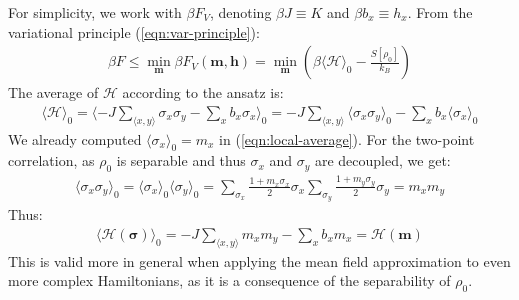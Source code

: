 \documentclass[../../main.tex]{subfiles}
\begin{document}
For simplicity, we work with $\beta F_V$, denoting $\beta J \equiv K$ and $\beta b_x \equiv h_x$. From the variational principle (\ref{eqn:var-principle}):
\begin{align}
    \beta F \leq  
    \min_{\bm{m}} \beta F_V(\bm{m}, \bm{h}) = \min_{\bm{m}} \left(
      \beta \langle \mathcal{H} \rangle_0 -\frac{S[\rho_0]}{k_B} \right) 
      \label{eqn:ising-variational}
\end{align}
The average of $\mathcal{H}$ according to the ansatz is:
\begin{align*}
    \langle \mathcal{H} \rangle_0 = \langle -J \sum_{\langle x,y \rangle} \sigma_x \sigma_y - \sum_x b_x \sigma_x \rangle_0 = -J \sum_{\langle x,y \rangle} \langle \sigma_x \sigma_y \rangle_0 - \sum_x b_x \langle \sigma_x \rangle_0
\end{align*}
We already computed $\langle \sigma_x \rangle_0 = m_x$ in (\ref{eqn:local-average}). For the two-point correlation, as $\rho_0$ is separable and thus $\sigma_x$ and $\sigma_y$ are decoupled, we get:
\begin{align*}
    \langle \sigma_x \sigma_y \rangle_0 = \langle \sigma_x \rangle_0 \langle \sigma_y \rangle_0 = \sum_{\sigma_x} \frac{1+m_x \sigma_x}{2} \sigma_x \sum_{\sigma_y} \frac{1+m_y \sigma_y}{2} \sigma_y = m_x m_y
\end{align*}
Thus:
\begin{align}\label{eqn:H0avg}
    \langle \mathcal{H}(\bm{\sigma}) \rangle_0 = -J \sum_{\langle x,y \rangle} m_x m_y - \sum_x b_x m_x = \mathcal{H}(\bm{m})
\end{align}
This is valid more in general when applying the mean field approximation to even more complex Hamiltonians, as it is a consequence of the separability of $\rho_0$.

\medskip
\end{document}
